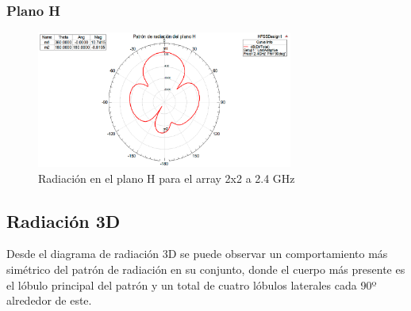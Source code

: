 \subsubsection{Plano H}
\begin{figure}[H]
    \centering
        \includegraphics[width=0.75\textwidth]{archivos/analisis/2x21/5}
        \caption{Radiación en el plano H para el array 2x2 a 2.4 GHz}
        \label{fig:H2x21}
\end{figure}

\subsection{Radiación 3D}
\par Desde el diagrama de radiación 3D se puede observar un comportamiento más simétrico del patrón de radiación en su conjunto, donde el cuerpo más presente es el lóbulo principal del patrón y un total de cuatro lóbulos laterales cada 90º alrededor de este.

